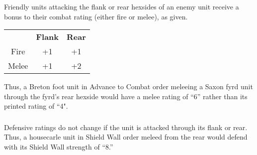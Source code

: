 \subsubsection[Flank or Rear]{} Friendly units attacking the flank or rear hexsides of an enemy unit receive a bonus to their combat rating (either fire or melee), as given.

\begin{center}
  \begin{tabular}{ |c|c|c| }
    \hline
    & \textbf{Flank} & \textbf{Rear} \\
    Fire & +1 & +1 \\
    Melee & +1 & +2 \\
    \hline
  \end{tabular}
\end{center}

Thus, a Breton foot unit in Advance to Combat order meleeing a Saxon fyrd unit through the fyrd's rear hexside would have a melee rating of “6” rather than its printed rating of “4".

\subsubsection[Defensive Ratings]{} Defensive ratings do not change if the unit is attacked through its flank or rear. Thus, a housecarle unit in Shield Wall order meleed from the rear would defend with its Shield Wall strength of “8.”